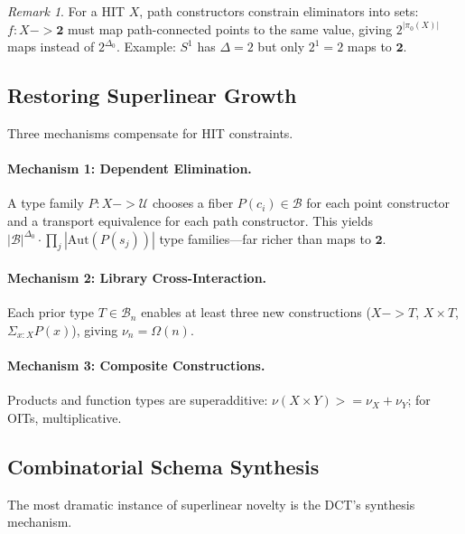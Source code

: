 \documentclass[11pt,a4paper]{article}
\def\geq{>=}%
\def\to{->}%
\theoremstyle{plain}
\theoremstyle{definition}
\theoremstyle{remark}
\newtheorem{remark}[theorem]{Remark}
\newcommand{\U}{\mathcal{U}}
\begin{document}
\begin{remark}
\label{rem:hit-constraints}
For a HIT $X$, path constructors constrain eliminators into sets: $f : X \to \mathbf{2}$ must map path-connected points to the same value, giving $2^{|\pi_0(X)|}$ maps instead of $2^{\Delta_0}$.
Example: $S^1$ has $\Delta = 2$ but only $2^1 = 2$ maps to $\mathbf{2}$.
\end{remark}

\subsection{Restoring Superlinear Growth}

Three mechanisms compensate for HIT constraints.

\paragraph{Mechanism 1: Dependent Elimination.}
A type family $P : X \to \U$ chooses a fiber $P(c_i) \in \mathcal{B}$ for each point constructor and a transport equivalence for each path constructor.
This yields $|\mathcal{B}|^{\Delta_0} \cdot \prod_j |\mathrm{Aut}(P(s_j))|$ type families---far richer than maps to $\mathbf{2}$.

\paragraph{Mechanism 2: Library Cross-Interaction.}
Each prior type $T \in \mathcal{B}_n$ enables at least three new constructions ($X \to T$, $X \times T$, $\Sigma_{x:X} P(x)$), giving $\nu_n = \Omega(n)$.

\paragraph{Mechanism 3: Composite Constructions.}
Products and function types are superadditive: $\nu(X \times Y) \geq \nu_X + \nu_Y$; for OITs, multiplicative.

\subsection{Combinatorial Schema Synthesis}
\label{sec:ltp}

The most dramatic instance of superlinear novelty is the DCT's synthesis mechanism.
\end{document}
